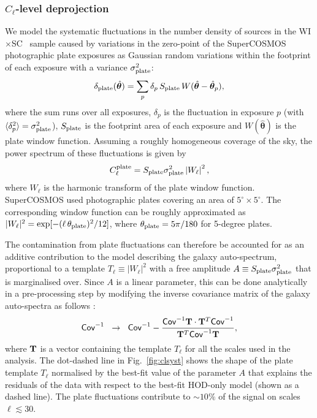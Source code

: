 \documentclass[useAMS,usenatbib]{mn2e}
\newcommand{\nv}{\hat{\boldsymbol{\theta}}}
\newcommand{\wisc}{WI$\times$SC}
\begin{document}
    \subsubsection{$C_\ell$-level deprojection}\label{sssec:methods.syst.plates}
      We model the systematic fluctuations in the number density of sources in the \wisc~ sample caused by variations in the zero-point of the SuperCOSMOS photographic plate exposures as Gaussian random variations within the footprint of each exposure with a variance $\sigma^2_{\rm plate}$:
      \begin{equation}
        \delta_{\rm plate}(\nv) = \sum_p \delta_p\,S_{\rm plate}\,W(\nv-\nv_p),
      \end{equation}
      where the sum runs over all exposures, $\delta_p$ is the fluctuation in exposure $p$ (with $\langle\delta_p^2\rangle=\sigma^2_{\rm plate}$), $S_{\rm plate}$ is the footprint area of each exposure and $W(\nv)$ is the plate window function. Assuming a roughly homogeneous coverage of the sky, the power spectrum of these fluctuations is given by
      \begin{equation}
        C_\ell^{\rm plate}=S_{\rm plate}\sigma_{\rm plate}^2\left|W_\ell\right|^2,
      \end{equation}
      where $W_\ell$ is the harmonic transform of the plate window function. SuperCOSMOS used photographic plates covering an area of $5^\circ\times5^\circ$. The corresponding window function can be roughly approximated as $|W_\ell|^2=\exp[-(\ell\,\theta_{\rm plate})^2/12]$, where $\theta_{\rm plate}=5\pi/180$ for 5-degree plates.
      
      The contamination from plate fluctuations can therefore be accounted for as an additive contribution to the model describing the galaxy auto-spectrum, proportional to a template $T_\ell\equiv|W_\ell|^2$ with a free amplitude $A\equiv S_{\rm plate}\sigma_{\rm plate}^2$ that is marginalised over. Since $A$ is a linear parameter, this can be done analytically in a pre-processing step by modifying the inverse covariance matrix of the galaxy auto-spectra as follows \citep{1992ApJ...398..169R}:
      \begin{equation}
        {\sf Cov}^{-1}\hspace{6pt}\rightarrow\hspace{6pt} {\sf Cov}^{-1}-\frac{{\sf Cov}^{-1}{\bf T}\cdot{\bf T}^T{\sf Cov}^{-1}}{{\bf T}^T{\sf Cov}^{-1}{\bf T}},
      \end{equation}
      where ${\bf T}$ is a vector containing the template $T_\ell$ for all the scales used in the analysis. The dot-dashed line in Fig.\!~\ref{fig:clsyst} shows the shape of the plate template $T_\ell$ normalised by the best-fit value of the parameter $A$ that explains the residuals of the data with respect to the best-fit HOD-only model (shown as a dashed line). The plate fluctuations contribute to $\sim10\%$ of the signal on scales $\ell\lesssim 30$.
\end{document}
